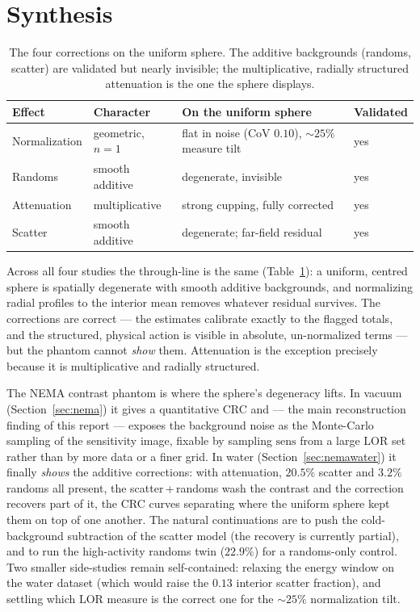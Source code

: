 \documentclass[11pt]{article}
\newcommand{\sens}{\text{sens}}
\begin{document}
\section{Synthesis}

\begin{table}[t]
  \centering
  \begin{tabular}{@{}llll@{}}
    \toprule
    Effect & Character & On the uniform sphere & Validated \\
    \midrule
    Normalization & geometric, $n=1$    & flat in noise (CoV $0.10$), $\sim\!25\%$ measure tilt & yes \\
    Randoms       & smooth additive     & degenerate, invisible            & yes \\
    Attenuation   & multiplicative      & strong cupping, fully corrected  & yes \\
    Scatter       & smooth additive     & degenerate; far-field residual   & yes \\
    \bottomrule
  \end{tabular}
  \caption{The four corrections on the uniform sphere. The additive backgrounds
  (randoms, scatter) are validated but nearly invisible; the multiplicative,
  radially structured attenuation is the one the sphere displays.}
  \label{tab:summary}
\end{table}

Across all four studies the through-line is the same (Table~\ref{tab:summary}): a
uniform, centred sphere is spatially degenerate with smooth additive backgrounds,
and normalizing radial profiles to the interior mean removes whatever residual
survives. The corrections are correct --- the estimates calibrate exactly to the
flagged totals, and the structured, physical action is visible in absolute,
un-normalized terms --- but the phantom cannot \emph{show} them. Attenuation is the
exception precisely because it is multiplicative and radially structured.

The NEMA contrast phantom is where the sphere's degeneracy lifts. In vacuum
(Section~\ref{sec:nema}) it gives a quantitative CRC and --- the main reconstruction
finding of this report --- exposes the background noise as the Monte-Carlo sampling of
the sensitivity image, fixable by sampling $\sens$ from a large LOR set rather than by
more data or a finer grid. In water (Section~\ref{sec:nemawater}) it finally
\emph{shows} the additive corrections: with attenuation, $20.5\%$ scatter and $3.2\%$
randoms all present, the scatter\,+\,randoms wash the contrast and the correction
recovers part of it, the CRC curves separating where the uniform sphere kept them on
top of one another. The natural continuations are to push the cold-background
subtraction of the scatter model (the recovery is currently partial), and to run the
high-activity randoms twin ($22.9\%$) for a randoms-only control. Two smaller
side-studies remain self-contained: relaxing the energy window on the water dataset
(which would raise the $0.13$ interior scatter fraction), and settling which LOR
measure is the correct one for the $\sim\!25\%$ normalization tilt.
\end{document}
